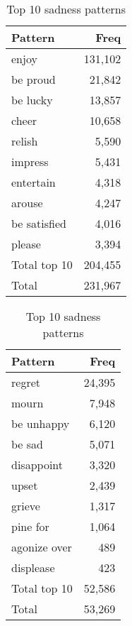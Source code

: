 \begin{table}[!htb]
    \begin{minipage}{.45\linewidth}
    		\centering
		\begin{tabular}{l|r}
			{\bf Pattern} & {\bf Freq} \\\hline
			enjoy         & 131,102         \\
			be proud      & 21,842          \\
			be lucky      & 13,857          \\
			cheer         & 10,658          \\
			relish        & 5,590           \\
			impress       & 5,431           \\
			entertain     & 4,318           \\
			arouse        & 4,247           \\
			be satisfied  & 4,016           \\
			please        & 3,394           \\\hline
			Total top 10  & 204,455         \\
			Total         & 231,967        
		\end{tabular}
		\caption{Top 10 joy patterns}
		\label{tab:joy-patterns}
	\end{minipage}
    	\begin{minipage}{.45\linewidth}
      	\centering
		\begin{tabular}{l|r}
			{\bf Pattern} & {\bf Freq} \\\hline
			regret        & 24,395          \\
			mourn         & 7,948           \\
			be unhappy    & 6,120           \\
			be sad        & 5,071           \\
			disappoint    & 3,320           \\
			upset         & 2,439           \\
			grieve        & 1,317           \\
			pine for      & 1,064           \\
			agonize over  & 489             \\
			displease     & 423             \\\hline
			Total top 10  & 52,586          \\
			Total         & 53,269          
		\end{tabular}
	\caption{Top 10 sadness patterns}
	\label{tab:sadness-patterns}
    \end{minipage}
\end{table}

